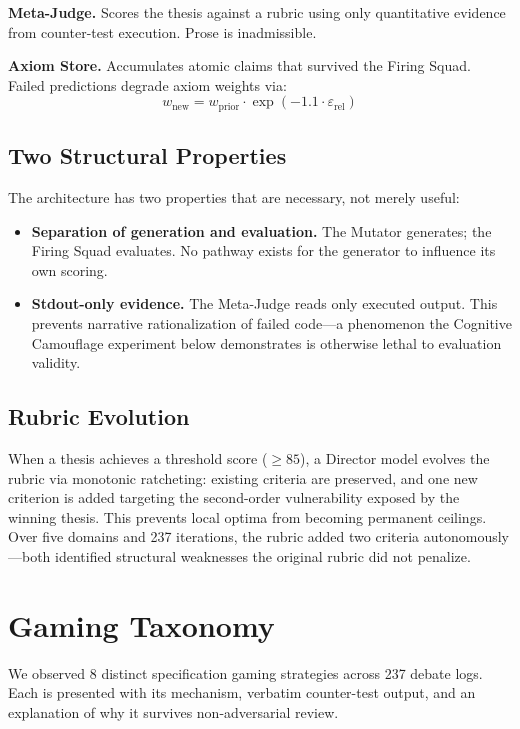 \documentclass[10pt,twocolumn]{article}
\begin{document}
\textbf{Meta-Judge.} Scores the thesis against a rubric using only
quantitative evidence from counter-test execution. Prose is
inadmissible.

\textbf{Axiom Store.} Accumulates atomic claims that survived the
Firing Squad. Failed predictions degrade axiom weights via:
\[
w_{\text{new}} = w_{\text{prior}} \cdot \exp(-1.1 \cdot \varepsilon_{\text{rel}})
\]

\subsection{Two Structural Properties}

The architecture has two properties that are necessary, not merely
useful:

\begin{itemize}[leftmargin=*,noitemsep]
    \item \textbf{Separation of generation and evaluation.} The
    Mutator generates; the Firing Squad evaluates. No pathway exists
    for the generator to influence its own scoring.
    \item \textbf{Stdout-only evidence.} The Meta-Judge reads only
    executed output. This prevents narrative rationalization of
    failed code---a phenomenon the Cognitive Camouflage experiment
    below demonstrates is otherwise lethal to evaluation validity.
\end{itemize}

\subsection{Rubric Evolution}

When a thesis achieves a threshold score ($\geq 85$), a Director model
evolves the rubric via monotonic ratcheting: existing criteria are
preserved, and one new criterion is added targeting the second-order
vulnerability exposed by the winning thesis. This prevents local
optima from becoming permanent ceilings. Over five domains and 237
iterations, the rubric added two criteria autonomously---both
identified structural weaknesses the original rubric did not penalize.

\section{Gaming Taxonomy}

We observed 8 distinct specification gaming strategies across 237
debate logs. Each is presented with its mechanism, verbatim
counter-test output, and an explanation of why it survives
non-adversarial review.
\end{document}
